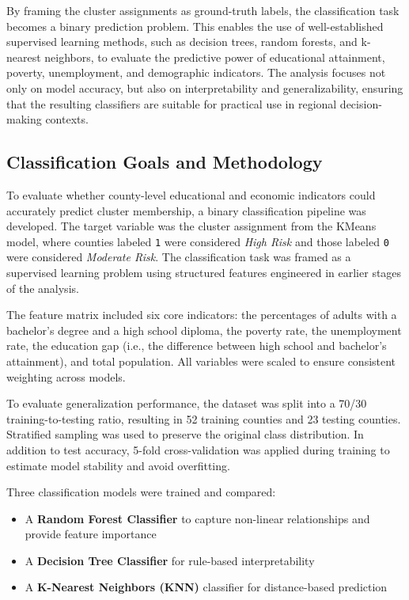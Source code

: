 \documentclass{llncs}
\begin{document}
By framing the cluster assignments as ground-truth labels, the classification task becomes a binary prediction problem. This enables the use of well-established supervised learning methods, such as decision trees, random forests, and k-nearest neighbors, to evaluate the predictive power of educational attainment, poverty, unemployment, and demographic indicators. The analysis focuses not only on model accuracy, but also on interpretability and generalizability, ensuring that the resulting classifiers are suitable for practical use in regional decision-making contexts.


\subsection{Classification Goals and Methodology}

To evaluate whether county-level educational and economic indicators could accurately predict cluster membership, a binary classification pipeline was developed. The target variable was the cluster assignment from the KMeans model, where counties labeled \texttt{1} were considered \textit{High Risk} and those labeled \texttt{0} were considered \textit{Moderate Risk}. The classification task was framed as a supervised learning problem using structured features engineered in earlier stages of the analysis.

The feature matrix included six core indicators: the percentages of adults with a bachelor’s degree and a high school diploma, the poverty rate, the unemployment rate, the education gap (i.e., the difference between high school and bachelor’s attainment), and total population. All variables were scaled to ensure consistent weighting across models.

To evaluate generalization performance, the dataset was split into a 70/30 training-to-testing ratio, resulting in 52 training counties and 23 testing counties. Stratified sampling was used to preserve the original class distribution. In addition to test accuracy, 5-fold cross-validation was applied during training to estimate model stability and avoid overfitting.

Three classification models were trained and compared:
\begin{itemize}
    \item A \textbf{Random Forest Classifier} to capture non-linear relationships and provide feature importance
    \item A \textbf{Decision Tree Classifier} for rule-based interpretability
    \item A \textbf{K-Nearest Neighbors (KNN)} classifier for distance-based prediction
\end{itemize}
\end{document}
